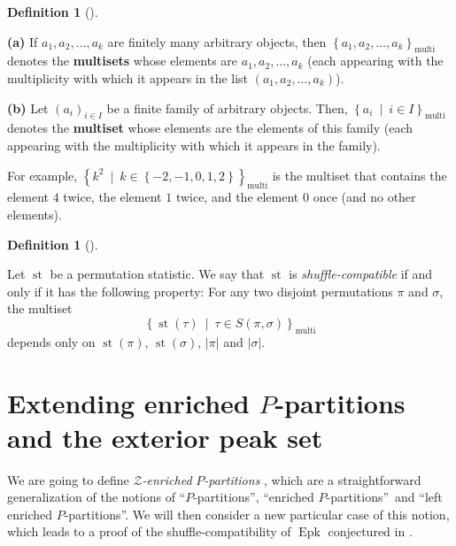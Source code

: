 \documentclass[numbers=enddot,12pt,final,onecolumn,notitlepage]{scrartcl}%
\theoremstyle{definition}
\newtheorem{defi}[theo]{Definition}
\newenvironment{definition}[1][]
{\begin{defi}[#1]\begin{leftbar}}
{\end{leftbar}\end{defi}}
\begin{document}
\begin{definition}
\textbf{(a)} If $a_{1},a_{2},\ldots,a_{k}$ are finitely many arbitrary
objects, then $\left\{  a_{1},a_{2},\ldots,a_{k}\right\}
_{\operatorname*{multi}}$ denotes the \textbf{multisets} whose elements are
$a_{1},a_{2},\ldots,a_{k}$ (each appearing with the multiplicity with which it
appears in the list $\left(  a_{1},a_{2},\ldots,a_{k}\right)  $).

\textbf{(b)} Let $\left(  a_{i}\right)  _{i\in I}$ be a finite family of
arbitrary objects. Then, $\left\{  a_{i}\ \mid\ i\in I\right\}
_{\operatorname*{multi}}$ denotes the \textbf{multiset} whose elements are the
elements of this family (each appearing with the multiplicity with which it
appears in the family).
\end{definition}

For example, $\left\{  k^{2}\ \mid\ k\in\left\{  -2,-1,0,1,2\right\}
\right\}  _{\operatorname*{multi}}$ is the multiset that contains the element
$4$ twice, the element $1$ twice, and the element $0$ once (and no other elements).

\begin{definition}
Let $\operatorname*{st}$ be a permutation statistic. We say that
$\operatorname*{st}$ is \textit{shuffle-compatible} if and only if it has the
following property: For any two disjoint permutations $\pi$ and $\sigma$, the
multiset%
\[
\left\{  \operatorname*{st}\left(  \tau\right)  \ \mid\ \tau\in S\left(
\pi,\sigma\right)  \right\}  _{\operatorname*{multi}}%
\]
depends only on $\operatorname*{st}\left(  \pi\right)  $, $\operatorname*{st}%
\left(  \sigma\right)  $, $\left\vert \pi\right\vert $ and $\left\vert
\sigma\right\vert $.
\end{definition}

\section{\label{sect.Zenri}Extending enriched $P$-partitions and the exterior
peak set}

We are going to define \textit{$\mathcal{Z}$-enriched }$P$\textit{-partitions}%
, which are a straightforward generalization of the notions of
\textquotedblleft$P$-partitions\textquotedblright, \textquotedblleft enriched
$P$-partitions\textquotedblright\ and \textquotedblleft left enriched
$P$-partitions\textquotedblright. We will then consider a new particular case
of this notion, which leads to a proof of the shuffle-compatibility of
$\operatorname*{Epk}$ conjectured in \cite{part1}.
\end{document}
